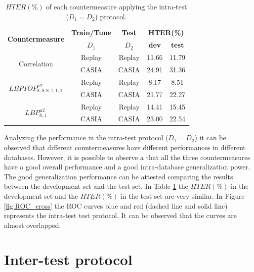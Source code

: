 \hspace{-17mm}\begin{table}[ht!]
\caption{$HTER(\%)$ of each countermeasure applying the intra-test ($D_1=D_2$) protocol.}
\begin{center}
  \begin{tabular}{ | c | c | c | c  c | }
    \hline

   \multirow{2}{*}{\textbf{Countermeasure}} & \textbf{Train/Tune} & \textbf{Test} & \multicolumn{2}{c|}{\textbf{HTER(\%)}} \\ 
     & $D_1$ & $D_2$ & \textbf{dev} & \textbf{test}  \\ \hline
    
    \multirow{2}{*}{Correlation} & Replay  & Replay  &  11.66 & 11.79 \\ 
               & CASIA &  CASIA  & 24.91 & 31.36 \\ \hline \hline

    \multirow{2}{*}{$LBPTOP_{8,8,8,1,1,1}^{u2}$}  & Replay & Replay  & 8.17 & 8.51  \\
               & CASIA  & CASIA  & 21.77 & 22.27 \\ \hline \hline

    \multirow{2}{*}{$LBP_{8,1}^{u2}$} & Replay  & Replay  & 14.41 &15.45  \\
               & CASIA  & CASIA  & 23.00  & 22.54 \\
            
    \hline
  \end{tabular}
\end{center}
\label{tb:IntraTest}
\end{table}

Analyzing the performance in the intra-test protocol ($D_1 = D_2$) it can be observed that different countermeasures have different performances in different databases. However, it is possible to observe a that all the three countermeasures have a good overall performance and a good intra-database generalization power. The good generalization performance can be attested comparing the results between the development set and the test set. In Table \ref{tb:IntraTest} the $HTER(\%)$ in the development set and the $HTER(\%)$ in the test set are very similar. In Figure \ref{fig:ROC_cross} the ROC curves blue and red (dashed line and solid line) represents the intra-test test protocol. It can be observed that the curves are almost overlapped.


\section{Inter-test protocol}
\label{sec:Intra_test}

